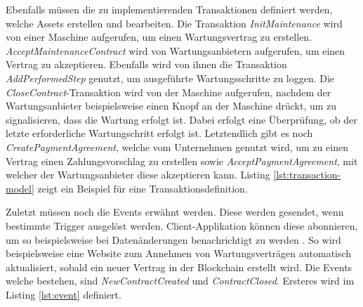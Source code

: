 Ebenfalls müssen die zu implementierenden Transaktionen definiert werden, welche Assets erstellen und bearbeiten. Die Transaktion \textit{InitMaintenance} wird von einer Maschine aufgerufen, um einen Wartungsvertrag zu erstellen. \textit{AcceptMaintenanceContract} wird von Wartungsanbietern aufgerufen, um einen Vertrag zu akzeptieren. Ebenfalls wird von ihnen die Transaktion \textit{AddPerformedStep} genutzt, um ausgeführte Wartungsschritte zu loggen. Die \textit{CloseContract}-Transaktion wird von der Maschine aufgerufen, nachdem der Wartungsanbieter beispielsweise einen Knopf an der Maschine drückt, um zu signalisieren, dass die Wartung erfolgt ist. Dabei erfolgt eine Überprüfung, ob der letzte erforderliche Wartungschritt erfolgt ist. Letztendlich gibt es noch \textit{CreatePaymentAgreement}, welche vom Unternehmen genutzt wird, um zu einen Vertrag einen Zahlungsvorschlag zu erstellen sowie \textit{AcceptPaymentAgreement}, mit welcher der Wartungsanbieter diese akzeptieren kann. Listing \ref{lst:transaction-model} zeigt ein Beispiel für eine Transaktionsdefinition.


Zuletzt müssen noch die Events erwähnt werden. Diese werden gesendet, wenn bestimmte Trigger ausgelöst werden. Client-Applikation können diese abonnieren, um so beispielsweise bei Datenänderungen benachrichtigt zu werden \cite{HyperledgerComposerTeamEmittingEventsHyperledger}. So wird beispielsweise eine Website zum Annehmen von Wartungsverträgen automatisch aktualisiert, sobald ein neuer Vertrag in der Blockchain erstellt wird. Die Events welche bestehen, sind \textit{NewContractCreated} und \textit{ContractClosed}. Ersteres wird im Listing \ref{lst:event} definiert. 


